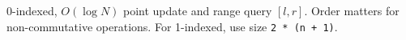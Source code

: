 
0-indexed, $O(\log N)$ point update and range query $[l, r]$. Order matters for non-commutative operations. For 1-indexed, use size \lstinline|2 * (n + 1)|.


